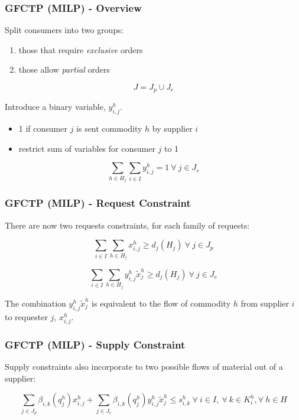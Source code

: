 \begin{frame}[ctb!]
  \frametitle{GFCTP (MILP) - Overview}

  Split consumers into two groups:
  \begin{enumerate}
    \item those that require \textit{exclusive} orders
    \item those allow \textit{partial} orders
  \end{enumerate}

  \begin{equation}\label{eqs:consumer-union}
    J = J_{p} \cup J_{e}
  \end{equation}

  Introduce a binary variable, $y_{i,j}^{h}$.  
  \begin{itemize}
    \item 1 if consumer $j$ is sent commodity $h$ by supplier $i$
    \item restrict sum of variables for consumer $j$ to 1
  \end{itemize}

  \begin{equation}
    \sum_{h \in H_j}\sum_{i \in I}  y_{i,j}^{h} = 1
     \: \forall \: j \in J_{e}
  \end{equation}
  
\end{frame}

\begin{frame}[ctb!]
  \frametitle{GFCTP (MILP) - Request Constraint} 

  There are now two requests constraints, for each family of requests:

  \begin{equation}
    \sum_{i \in I}\sum_{h \in H_{j}} x_{i,j}^{h} \geq d_{j}(H_{j})
     \: \forall \: j \in J_{p}
  \end{equation}
  
  \begin{equation}    
    \sum_{i \in I}\sum_{h \in H_{j}} y_{i,j}^{h} \tilde{x}_{j}^{h} \geq d_{j}(H_{j}) 
     \: \forall \: j \in J_{e}
  \end{equation}

  The combination $y_{i,j}^{h} \tilde{x}_{j}^{h}$ is equivalent to the flow of
  commodity $h$ from supplier $i$ to requester $j$, $x^h_{i,j}$.
\end{frame}

\begin{frame}[ctb!]
  \frametitle{GFCTP (MILP) - Supply Constraint} 

  Supply constraints also incorporate to two possible flows of material out of a
  supplier:
  
  \begin{equation}    
    \sum_{j \in J_{p}}\beta_{i,k}(q_{j}^{h}) x_{i,j}^{h}
    + \sum_{j \in J_{e}}\beta_{i,k}(q_{j}^{h}) y_{i,j}^{h} \tilde{x}_{j}^{h} \leq s_{i,k}^{h}
     \: \forall \: i \in I, \: \forall \: k \in K_{i}^{h}, \forall \: {h \in H}
  \end{equation}
  
\end{frame}

